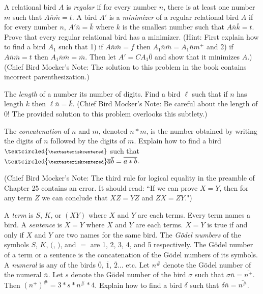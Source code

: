 \documentclass[12pt, letterpaper]{article}
\begin{document}
\begin{prob}{24.10}
A relational bird $A$ is \emph{regular} if for every number $n$, there is at least one number $m$ such that $A\overline{n}\overline{m} = t$. A bird $A'$ is a \emph{minimizer} of a regular relational bird $A$ if for every number $n$, $A'\overline{n} = \overline{k}$ where $k$ is the smallest number such that $A\overline{n}\overline{k} = t$. Prove that every regular relational bird has a minimizer. (Hint: First explain how to find a bird $A_1$ such that 1) if $A\overline{n}\overline{m} = f$ then $A_1\overline{n}\overline{m} = A_1\overline{n}\overline{m^+}$ and 2) if $A\overline{n}\overline{m} = t$ then $A_1\overline{n}\overline{m} = \overline{m}$. Then let $A' = CA_1\overline{0}$ and show that it minimizes $A$.) (Chief Bird Mocker's Note: The solution to this problem in the book contains incorrect parenthesization.)
\end{prob}

\begin{prob}{24.11}
The \emph{length} of a number its number of digits. Find a bird $\ell$ such that if $n$ has length $k$ then $\ell\overline{n} = \overline{k}$. (Chief Bird Mocker's Note: Be careful about the length of 0! The provided solution to this problem overlooks this subtlety.)
\end{prob}

\begin{prob}{24.12}
The \emph{concatenation} of $n$ and $m$, denoted $n \ast m$, is the number obtained by writing the digits of $n$ followed by the digits of $m$. Explain how to find a bird $\small \textcircled{\scriptsize \textasteriskcentered}$ such that $\small \textcircled{\scriptsize \textasteriskcentered}\overline{a}\overline{b} = \overline{a \ast b}$.
\end{prob}

\noindent(Chief Bird Mocker's Note: The third rule for logical equality in the preamble of Chapter 25 contains an error. It should read: ``If we can prove $X = Y$, then for any term $Z$ we can conclude that $XZ = YZ$ and $ZX = ZY$.")

\begin{prob}{25.1}
A \emph{term} is $S$, $K$, or $(XY)$ where $X$ and $Y$ are each terms. Every term names a bird. A \emph{sentence} is $X = Y$ where $X$ and $Y$ are each terms. $X = Y$ is true if and only if $X$ and $Y$ are two names for the same bird. The \emph{G\"{o}del numbers} of the symbols $S$, $K$, $($, $)$, and $=$ are 1, 2, 3, 4, and 5 respectively. The G\"{o}del number of a term or a sentence is the concatenation of the G\"{o}del numbers of its symbols. A \emph{numeral} is any of the birds $\overline{0}$, $\overline{1}$, $\overline{2}$... etc. Let $n^\#$ denote the G\"{o}del number of the numeral $\overline{n}$. Let $s$ denote the G\"{o}del number of the bird $\sigma$ such that $\sigma \overline{n} = \overline{n^+}$. Then $(n^+)^\# = 3 \ast s \ast n^\# \ast 4$. Explain how to find a bird $\delta$ such that $\delta \overline{n} = \overline{n^\#}$.
\end{prob}
\end{document}
